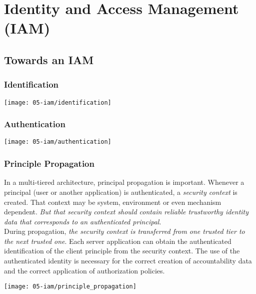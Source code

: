 

\section{Identity and Access Management (IAM)}

\subsection{Towards an IAM}

\subsubsection{Identification}
\begin{center}
    \texttt{[image: 05-iam/identification]}
    \vspace{-8pt}
\end{center}

\subsubsection{Authentication}
\begin{center}
    \texttt{[image: 05-iam/authentication]}
    \vspace{-8pt}
\end{center}

\subsubsection{Principle Propagation}
\begin{minipage}{0.5\linewidth}
    In a multi-tiered architecture, principal propagation is important. Whenever a principal (user or another application) is authenticated, a \textit{security context} is created. That context may be system, environment or even mechanism dependent. \textit{But that security context should contain reliable trustworthy identity data that corresponds to an authenticated principal}.\\

    During propagation, \textit{the security context is transferred from one trusted tier to the next trusted one}. Each server application can obtain the authenticated identification of the client principle from the security context. The use of the authenticated identity is necessary for the correct creation of accountability data and the correct application of authorization policies.\\
\end{minipage}
\begin{minipage}{0.45\linewidth}
    \begin{center}
        \texttt{[image: 05-iam/principle\_propagation]}
        \vspace{-8pt}
    \end{center}
\end{minipage}

